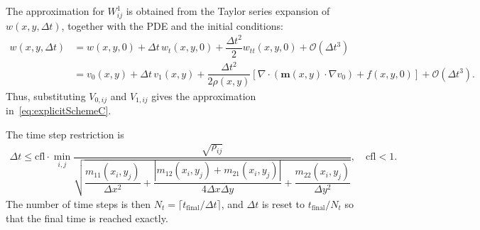\documentclass[11pt]{article}
\begin{document}
The approximation for $W^1_{ij}$ is obtained from the Taylor series expansion of $w(x,y,\Delta t)$, together with the PDE and the initial conditions:
\begin{align*}
w(x,y,\Delta t) &= w(x,y,0)+\Delta t\, w_t(x,y,0) + \dfrac{\Delta t^2}{2} w_{tt}(x,y,0)+\mathcal{O}(\Delta t^3)\\
	&=v_0(x,y) + \Delta t\, v_1(x,y) + \dfrac{\Delta t^2}{2\rho(x,y)} \left[\nabla\cdot\left(\bm{m}(x,y)\cdot\nabla v_0\right) +f(x,y,0)\right]+\mathcal{O}(\Delta t^3).
\end{align*}
Thus, substituting $V_{0,ij}$ and $V_{1,ij}$ gives the approximation in~\eqref{eq:explicitSchemeC}.

The time step restriction is
\begin{align}
	\Delta t \leq \mbox{cfl} \cdot \min_{i,j}\dfrac{\sqrt{\rho_{ij}}}{\sqrt{\dfrac{m_{11}(x_i,y_j)}{\Delta x^2} + \dfrac{\left|m_{12}(x_i,y_j)+m_{21}(x_i,y_j)\right|}{4\Delta x \Delta y} + \dfrac{m_{22}(x_i,y_j)}{\Delta y^2}}}, \quad \mbox{cfl} < 1.
\end{align}
The number of time steps is then $N_t = \lceil t_{\text{final}}/\Delta t \rceil$, and $\Delta t$ is reset to $t_{\text{final}}/N_t$ so that the final time is reached exactly.
\end{document}
